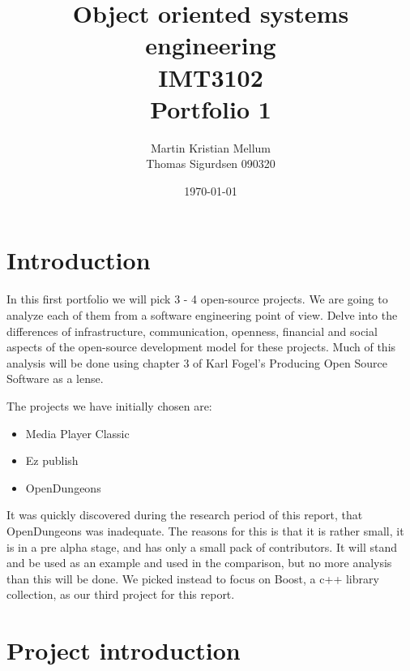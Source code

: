 \documentclass{report} %
\title{Object oriented systems engineering \\ IMT3102 \\ Portfolio 1}
\author{Martin Kristian Mellum  \\ Thomas Sigurdsen 090320} %
\date{\today}
\begin{document}
\maketitle       %
\tableofcontents %
\pagebreak	%

\section{Introduction} %
In this first portfolio we will pick 3 - 4 open-source projects. We are going to analyze each of them from a software engineering point of view. Delve into the differences of infrastructure, communication, openness, financial and social aspects of the open-source development model for these projects. Much of this analysis will be done using chapter 3 of Karl Fogel's Producing Open Source Software\cite{kfposs} as a lense.

The projects we have initially chosen are:
\begin{itemize}
\item Media Player Classic\cite{mpcweb}
\item Ez publish\cite{ezpubweb}
\item OpenDungeons\cite{odweb} %
\end{itemize}
It was quickly discovered during the research period of this report, that OpenDungeons was inadequate. The reasons for this is that it is rather small, it is in a pre alpha stage, and has only a small pack of contributors. It will stand and be used as an example and used in the comparison, but no more analysis than this will be done. We picked instead to focus on Boost\cite{boostweb}, a c++ library collection, as our third project for this report.

\section{Project introduction}
\end{document}
